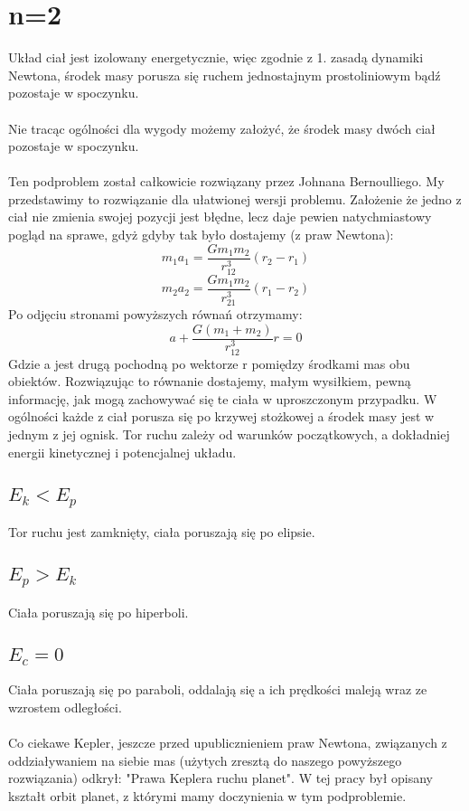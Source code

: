 \documentclass{article}
\begin{document}
\section{n=2}
Układ ciał jest izolowany energetycznie, więc zgodnie z 1. zasadą dynamiki Newtona, środek masy porusza się ruchem jednostajnym prostoliniowym bądź pozostaje w spoczynku.\\\\
Nie tracąc ogólności dla wygody możemy założyć, że środek masy dwóch ciał pozostaje w spoczynku.\\\\
Ten podproblem został całkowicie rozwiązany przez Johnana Bernoulliego. My przedstawimy to rozwiązanie dla ułatwionej wersji problemu.
Założenie że jedno z ciał nie zmienia swojej pozycji jest błędne, lecz daje pewien natychmiastowy pogląd na sprawe, gdyż gdyby tak było dostajemy (z praw Newtona):
$$ m_1 a_1 = \frac{G m_1 m_2}{ r_{12}^3} (r_2-r_1)$$
$$ m_2 a_2= \frac{G m_1 m_2}{ r_{21}^3} (r_1-r_2)$$
Po odjęciu stronami powyższych równań otrzymamy:
$$ a+ \frac{G(m_1+m_2)}{r_{12}^3}r=0$$
Gdzie a jest drugą pochodną po wektorze r pomiędzy środkami mas obu obiektów. Rozwiązując to równanie dostajemy, małym wysiłkiem, pewną informację, jak mogą zachowywać się te ciała w uproszczonym przypadku.
W ogólności każde z ciał porusza się po krzywej stożkowej a środek masy jest w jednym z jej ognisk. Tor ruchu zależy od warunków początkowych, a dokładniej energii kinetycznej i potencjalnej układu.
\subsection*{$E_k < E_p$}
Tor ruchu jest zamknięty, ciała poruszają się po elipsie.
\subsection*{$E_p > E_k$}
Ciała poruszają się po hiperboli.
\subsection*{$E_c = 0$}
Ciała poruszają się po paraboli, oddalają się a ich prędkości maleją wraz ze wzrostem odległości.\\\\
Co ciekawe Kepler, jeszcze przed upublicznieniem praw Newtona, związanych z oddziaływaniem na siebie mas (użytych zresztą do naszego powyższego rozwiązania) odkrył: "Prawa Keplera ruchu planet". W tej pracy był opisany kształt orbit planet, z którymi mamy doczynienia w tym podproblemie.
\clearpage
\end{document}
